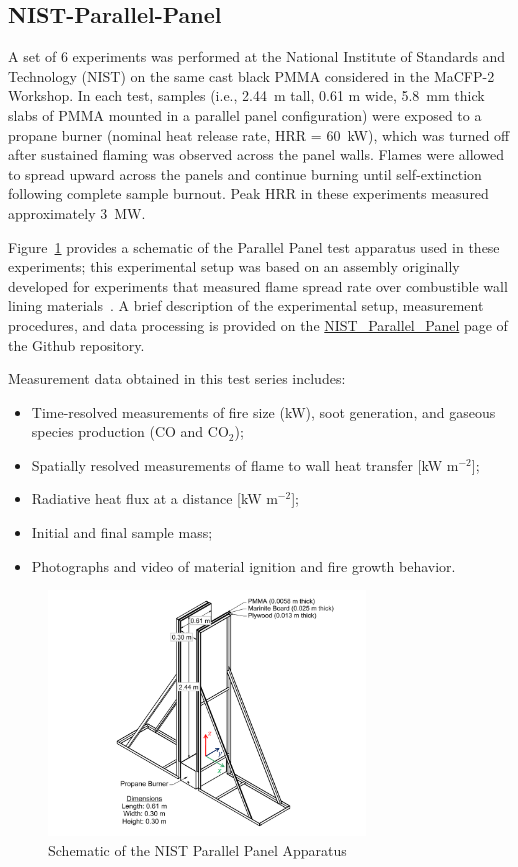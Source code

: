 \documentclass[12pt]{article}
\begin{document}
\FloatBarrier
\subsection {NIST-Parallel-Panel}
A set of 6 experiments was performed at the National Institute of Standards and Technology (NIST) on the same cast black PMMA considered in the MaCFP-2 Workshop. In each test, samples (i.e., 2.44~m tall, 0.61 m wide, 5.8~mm thick slabs of PMMA mounted in a parallel panel configuration) were exposed to a propane burner (nominal heat release rate, HRR = 60~kW), which was turned off after sustained flaming was observed across the panel walls. Flames were allowed to spread upward across the panels and continue burning until self-extinction following complete sample burnout. Peak HRR in these experiments measured approximately 3~MW.

Figure~\ref{fig:Panel_Schematic} provides a schematic of the Parallel Panel test apparatus used in these experiments; this experimental setup was based on an assembly originally developed for experiments that measured flame spread rate over combustible wall lining materials~\cite{Beaulieu2007Parallel}. A brief description of the experimental setup, measurement procedures, and data processing is provided on the \href{https://github.com/MaCFP/macfp-db/tree/master/Fire_Growth/NIST_Parallel_Panel}{NIST\_Parallel\_Panel} page of the Github repository.

Measurement data obtained in this test series includes:
\begin{itemize}[noitemsep]
\item Time-resolved measurements of fire size (kW), soot generation, and gaseous species production (CO and CO$_2$);
\item Spatially resolved measurements of flame to wall heat transfer [kW m$^{-2}$];
\item Radiative heat flux at a distance [kW m$^{-2}$];
\item Initial and final sample mass;
\item Photographs and video of material ignition and fire growth behavior.
\end{itemize}

\begin{figure}
     \centering
         \includegraphics[width=0.75\textwidth]{../../Fire_Growth/NIST_Parallel_Panel/Documentation/Panel_Assembly.pdf}
         \caption{Schematic of the NIST Parallel Panel Apparatus}
         \label{fig:Panel_Schematic}
\end{figure}
\end{document}
